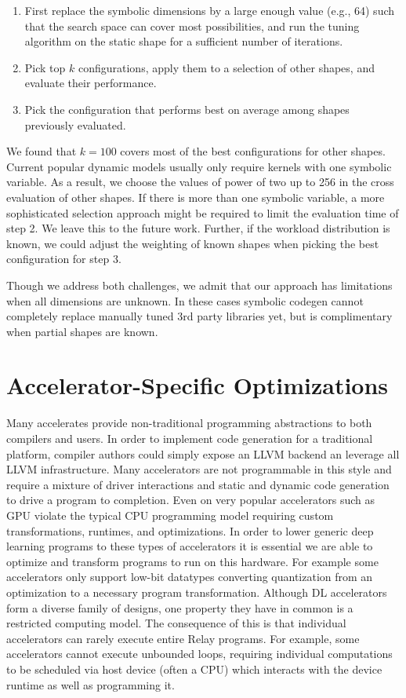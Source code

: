 \begin{enumerate}
    \item First replace the symbolic dimensions by a large enough value (e.g., 64) such that the search space can cover most possibilities, and run the tuning algorithm on the static shape for a sufficient number of iterations.
    \item Pick top $k$ configurations, apply them to a selection of other shapes, and evaluate their performance.
    \item Pick the configuration that performs best on average among shapes previously evaluated.
\end{enumerate}

We found that $k=100$ covers most of the best configurations for other shapes.
Current popular dynamic models usually only require kernels with one symbolic variable.
As a result, we choose the values of power of two up to 256 in the cross evaluation of other shapes.
If there is more than one symbolic variable, a more sophisticated selection approach might be
  required to limit the evaluation time of step 2.
We leave this to the future work.
Further, if the workload distribution is known, we could adjust the weighting
  of known shapes when picking the best configuration for step 3.

Though we address both challenges, we admit that our approach has limitations when
  all dimensions are unknown.
In these cases symbolic codegen cannot completely replace manually tuned 3rd party libraries yet,
  but is complimentary when partial shapes are known.

\section{Accelerator-Specific Optimizations}
\label{sec:accel-opts}

Many accelerates provide non-traditional programming
    abstractions to both compilers and users.
In order to implement code generation for a
  traditional platform, compiler authors could
  simply expose an LLVM backend an leverage
  all LLVM infrastructure.
Many accelerators are not programmable in this style
    and require a mixture of driver interactions
    and static and dynamic code generation to
    drive a program to completion.
Even on very popular accelerators such as GPU
    violate the typical CPU programming model
    requiring custom transformations, runtimes,
    and optimizations.
In order to lower generic deep learning programs
    to these types of accelerators it is
    essential we are able to optimize and transform
    programs to run on this hardware.
For example some accelerators only support
    low-bit datatypes converting quantization
    from an optimization to a necessary program
    transformation.
Although DL accelerators form a diverse family of designs,
  one property they have in common is a restricted computing model.
The consequence of this is that individual accelerators
  can rarely execute entire Relay programs.
For example, some accelerators cannot execute unbounded loops,
  requiring individual computations to be scheduled via
  host device (often a CPU) which interacts with the device runtime
  as well as programming it.

